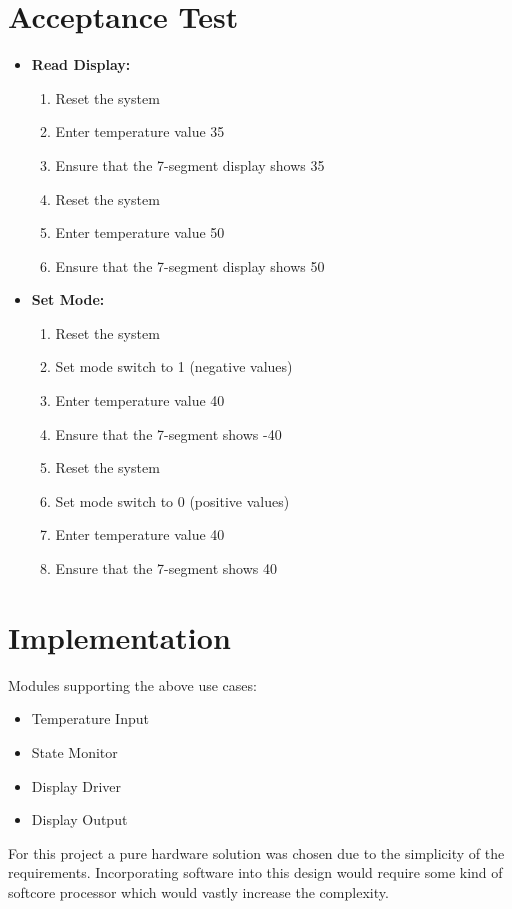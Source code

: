 \documentclass[12pt]{article}
\begin{document}
\section*{Acceptance Test}
\begin{itemize}
    \item \textbf{Read Display:} 
        \begin{enumerate}
            \item Reset the system
            \item Enter temperature value 35
            \item Ensure that the 7-segment display shows 35
            \item Reset the system
            \item Enter temperature value 50
            \item Ensure that the 7-segment display shows 50
        \end{enumerate}

    \item \textbf{Set Mode:} 
        \begin{enumerate}
            \item Reset the system
            \item Set mode switch to 1 (negative values)
            \item Enter temperature value 40
            \item Ensure that the 7-segment shows -40
            \item Reset the system
            \item Set mode switch to 0 (positive values)
            \item Enter temperature value 40
            \item Ensure that the 7-segment shows 40
        \end{enumerate}

\end{itemize}

\section*{Implementation}
Modules supporting the above use cases:
        \begin{itemize}
            \item Temperature Input
            \item State Monitor
            \item Display Driver
            \item Display Output
        \end{itemize}
For this project a pure hardware solution was chosen due to the simplicity of the requirements. Incorporating software into this design would require some kind of softcore processor which would vastly increase the complexity.
\end{document}
